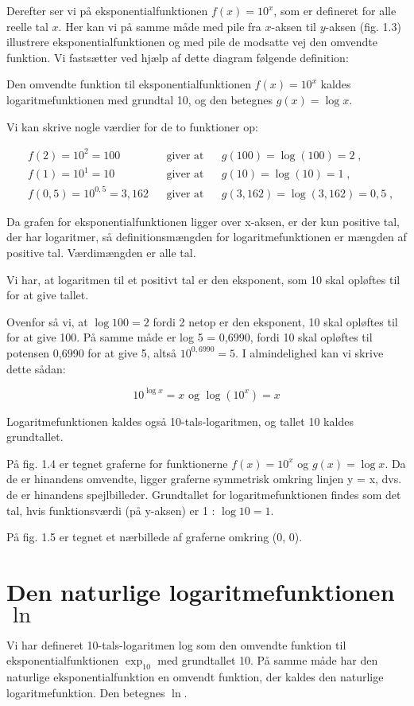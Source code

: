 \documentclass[12pt,oneside,a4paper]{article}
\theoremstyle{plain}
\begin{document}
Derefter ser vi på eksponentialfunktionen $f(x) = 10^x$, som er defineret for alle
reelle tal $x$. Her kan vi på samme måde med pile fra $x$-aksen til $y$-aksen (fig.
1.3) illustrere eksponentialfunktionen og med pile de modsatte vej den omvendte
funktion. Vi fastsætter ved hjælp af dette diagram følgende definition:

Den omvendte funktion til eksponentialfunktionen $f(x) = 10^x$ kaldes
logaritmefunktionen med grundtal 10, og den betegnes $g(x) = \log x$.

Vi kan skrive nogle værdier for de to funktioner op:

\[
\begin{aligned}
    &f(2) = 10^2 = 100 && \text{giver at} && g(100) = \log (100) = 2 \; , \\
    &f(1) = 10^1 = 10 && \text{giver at} && g(10) = \log (10) = 1 \; , \\
    &f(0,5) = 10^{0,5} = 3,162 && \text{giver at} && g(3,162) = \log (3,162) = 0,5 \; ,
\end{aligned}
\]

Da grafen for eksponentialfunktionen ligger over x-aksen, er der kun positive
tal, der har logaritmer, så definitionsmængden for logaritmefunktionen er
mængden af positive tal. Værdimængden er alle tal.

Vi har, at logaritmen til et positivt tal er den eksponent, som 10 skal
opløftes til for at give tallet.

Ovenfor så vi, at $\log 100 = 2$ fordi 2 netop er den eksponent, 10 skal opløftes
til for at give 100. På samme måde er log 5 = 0,6990, fordi 10 skal opløftes
til potensen 0,6990 for at give 5, altså $10^{0,6990} = 5$. I almindelighed kan
vi skrive dette sådan:

\[
\tag{1} 10^{\log x } = x \text{ og } \log (10^x) = x
\]

Logaritmefunktionen kaldes også 10-tals-logaritmen, og tallet 10 kaldes grundtallet.

På fig. 1.4 er tegnet graferne for funktionerne $f(x) = 10^x$ og $g(x) = \log x$. Da
de er hinandens omvendte, ligger graferne symmetrisk omkring linjen y = x, dvs.
de er hinandens spejlbilleder. Grundtallet for logaritmefunktionen findes som
det tal, hvis funktionsværdi (på y-aksen) er 1 : $\log 10 = 1$.

På fig. 1.5 er tegnet et nærbillede af graferne omkring (0, 0).

\section*{Den naturlige logaritmefunktionen $\ln$}
Vi har defineret 10-tals-logaritmen log som den omvendte funktion til
eksponentialfunktionen $\exp_{10}$ med grundtallet 10. På samme måde har den
naturlige eksponentialfunktion en omvendt funktion, der kaldes den naturlige
logaritmefunktion. Den betegnes $\ln$.
\end{document}
